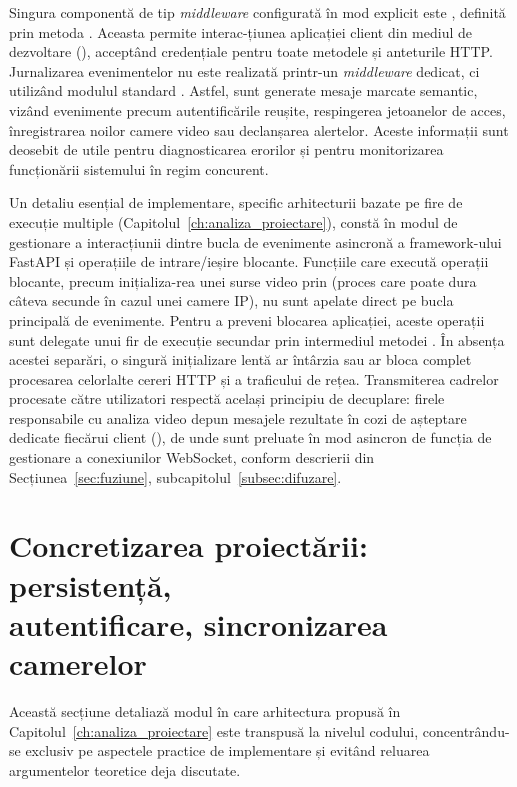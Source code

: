 \documentclass[../../main.tex]{subfiles}
\begin{document}
Singura componentă de tip \textit{middleware} configurată în mod explicit este \linebreak {}, definită prin metoda . Aceasta permite interac-țiunea aplicației client din mediul de dezvoltare (), acceptând credențiale pentru toate metodele și anteturile HTTP. Jurnalizarea evenimentelor nu este realizată printr-un \textit{middleware} dedicat, ci utilizând modulul standard . Astfel, sunt generate mesaje marcate semantic, vizând evenimente precum autentificările reușite, respingerea jetoanelor de acces, înregistrarea noilor camere video sau declanșarea alertelor. Aceste informații sunt deosebit de utile pentru diagnosticarea erorilor și pentru monitorizarea funcționării sistemului în regim concurent.

Un detaliu esențial de implementare, specific arhitecturii bazate pe fire de execuție multiple (Capitolul~\ref{ch:analiza_proiectare}), constă în modul de gestionare a interacțiunii dintre bucla de evenimente asincronă a framework-ului FastAPI și operațiile de intrare/ieșire blocante. Funcțiile care execută operații blocante, precum inițializa-rea unei surse video prin  (proces care poate dura câteva secunde în cazul unei camere IP), nu sunt apelate direct pe bucla principală de evenimente. Pentru a preveni blocarea aplicației, aceste operații sunt delegate unui fir de execuție secundar prin intermediul metodei . În absența acestei separări, o singură inițializare lentă ar întârzia sau ar bloca complet procesarea celorlalte cereri HTTP și a traficului de rețea. Transmiterea cadrelor procesate către utilizatori respectă același principiu de decuplare: firele responsabile cu analiza video depun mesajele rezultate în cozi de așteptare dedicate fiecărui client (), de unde sunt preluate în mod asincron de funcția de gestionare a conexiunilor WebSocket, conform descrierii din Secțiunea~\ref{sec:fuziune}, subcapitolul~\ref{subsec:difuzare}.


\section{Concretizarea proiectării: persistență, \\ autentificare, sincronizarea camerelor}
\label{sec:autentificare}

Această secțiune detaliază modul în care arhitectura propusă în Capitolul~\ref{ch:analiza_proiectare} este transpusă la nivelul codului, concentrându-se exclusiv pe aspectele practice de implementare și evitând reluarea argumentelor teoretice deja discutate.
\end{document}
